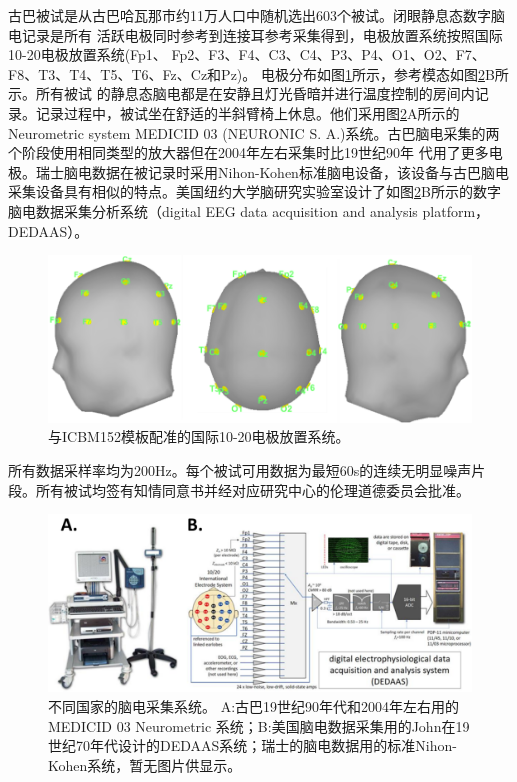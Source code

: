 古巴被试是从古巴哈瓦那市约11万人口中随机选出603个被试。闭眼静息态数字脑电记录是所有
活跃电极同时参考到连接耳参考采集得到，电极放置系统按照国际10-20电极放置系统(Fp1、
Fp2、F3、F4、C3、C4、P3、P4、O1、O2、F7、F8、T3、T4、T5、T6、Fz、Cz和Pz)。 电极分布如图\ref{6:ele}所示，参考模态如图\ref{6:amp}B所示。所有被试
的静息态脑电都是在安静且灯光昏暗并进行温度控制的房间内记录。记录过程中，被试坐在舒适的半斜臂椅上休息。他们采用图\ref{6:amp}A所示的
Neurometric system MEDICID 03 (NEURONIC S. A.)系统。古巴脑电采集的两个阶段使用相同类型的放大器但在2004年左右采集时比19世纪90年
代用了更多电极。瑞士脑电数据在被记录时采用Nihon-Kohen标准脑电设备，该设备与古巴脑电采集设备具有相似的特点。美国纽约大学脑研究实验室设计了如图\ref{6:amp}B所示的数字脑电数据采集分析系统（digital EEG data acquisition and analysis platform，DEDAAS）。
\begin{figure}[!h]
\includegraphics[width=13cm]{pic/Norm/figure2.png}
\caption{与ICBM152模板配准的国际10-20电极放置系统。}
\label{6:ele}
\end{figure}
所有数据采样率均为200Hz。每个被试可用数据为最短60s的连续无明显噪声片段。所有被试均签有知情同意书并经对应研究中心的伦理道德委员会批准。
\begin{figure}[!h]
\includegraphics[width=15cm]{pic/Norm/figure3.png}
\caption{不同国家的脑电采集系统。 A:古巴19世纪90年代和2004年左右用的MEDICID 03 Neurometric 系统；B:美国脑电数据采集用的John在19
世纪70年代设计的DEDAAS系统；瑞士的脑电数据用的标准Nihon-Kohen系统，暂无图片供显示。}
\label{6:amp}
\end{figure}

